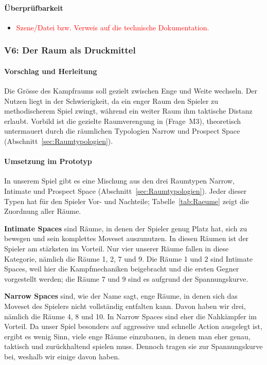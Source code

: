\documentclass[../Main.tex]{subfiles}
\begin{document}
\paragraph{Überprüfbarkeit}
\begin{itemize}[leftmargin=1.5cm]
    \item \textcolor{red}{Szene/Datei bzw. Verweis auf die technische Dokumentation.}
\end{itemize}

\subsubsection{V6: Der Raum als Druckmittel} \label{sec:V6}

\paragraph{Vorschlag und Herleitung}
Die Grösse des Kampfraums soll gezielt zwischen Enge und Weite wechseln. Der Nutzen liegt in der Schwierigkeit, da ein enger Raum den Spieler zu methodischerem Spiel zwingt, während ein weiter Raum ihm taktische Distanz erlaubt. Vorbild ist die gezielte Raumverengung in  (Frage~M3), theoretisch untermauert durch die räumlichen Typologien Narrow und Prospect Space (Abschnitt~\ref{sec:Raumtypologien}).

\paragraph{Umsetzung im Prototyp}
In unserem Spiel gibt es eine Mischung aus den drei Raumtypen Narrow, Intimate und Prospect Space (Abschnitt~\ref{sec:Raumtypologien}). Jeder dieser Typen hat für den Spieler Vor- und Nachteile; Tabelle~\ref{tab:Raeume} zeigt die Zuordnung aller Räume.

\textbf{Intimate Spaces} sind Räume, in denen der Spieler genug Platz hat, sich zu bewegen und sein komplettes Moveset auszunutzen. In diesen Räumen ist der Spieler am stärksten im Vorteil. Nur vier unserer Räume fallen in diese Kategorie, nämlich die Räume 1, 2, 7 und 9. Die Räume 1 und 2 sind Intimate Spaces, weil hier die Kampfmechaniken beigebracht und die ersten Gegner vorgestellt werden; die Räume 7 und 9 sind es aufgrund der Spannungskurve.

\textbf{Narrow Spaces} sind, wie der Name sagt, enge Räume, in denen sich das Moveset des Spielers nicht vollständig entfalten kann. Davon haben wir drei, nämlich die Räume 4, 8 und 10. In Narrow Spaces sind eher die Nahkämpfer im Vorteil. Da unser Spiel besonders auf aggressive und schnelle Action ausgelegt ist, ergibt es wenig Sinn, viele enge Räume einzubauen, in denen man eher genau, taktisch und zurückhaltend spielen muss. Dennoch tragen sie zur Spannungskurve bei, weshalb wir einige davon haben.
\end{document}
